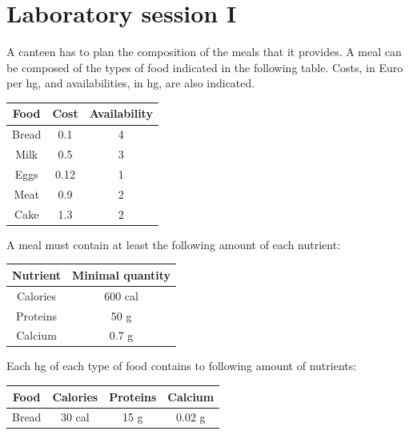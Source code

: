 \documentclass[12pt, a4paper]{report}
\newtheorem[style=M,bodystyle=\normalfont]{theorem}{Theorem}
\newtheorem[style=M,bodystyle=\normalfont]{corollary}{Corollary}
\newtheorem[style=M,bodystyle=\normalfont]{lemma}{Lemma}
\newtheorem[style=M,bodystyle=\normalfont]{definition}{Definition}
\begin{document}
\chapter{Laboratory session I}
\begin{Exercise}[label=a]
    A canteen has to plan the composition of the meals that it provides. A meal can be composed of the types of food indicated in the following table. 
    Costs, in Euro per hg, and availabilities, in hg, are also indicated.
    \begin{table}[H]
        \centering
        \begin{tabular}{|c|c|c|}
        \hline
        \textbf{Food} & \textbf{Cost} & \textbf{Availability} \\ \hline
        Bread         & 0.1           & 4                     \\
        Milk          & 0.5           & 3                     \\
        Eggs          & 0.12          & 1                     \\
        Meat          & 0.9           & 2                     \\
        Cake          & 1.3           & 2                     \\ \hline
        \end{tabular}
    \end{table}
    A meal must contain at least the following amount of each nutrient: 
    \begin{table}[H]
        \centering
        \begin{tabular}{|c|c|}
        \hline
        Nutrient & Minimal quantity \\ \hline
        Calories & 600 cal          \\
        Proteins & 50 g             \\
        Calcium  & 0.7 g            \\ \hline
        \end{tabular}
    \end{table}
    Each hg of each type of food contains to following amount of nutrients: 
    \begin{table}[H]
        \centering
        \begin{tabular}{|cccc|}
        \hline
        \textbf{Food}               & \textbf{Calories}            & \textbf{Proteins}         & \textbf{Calcium} \\ \hline
        \multicolumn{1}{|c|}{Bread} & \multicolumn{1}{c|}{30 cal}  & \multicolumn{1}{c|}{15 g} & 0.02 g           \\

\end{tabular}
\end{table}
\end{Exercise}
\end{document}
